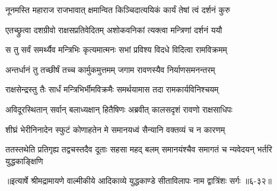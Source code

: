 \twolineshloka
{नूनमस्ति महाराज राजभावात् क्षमान्वित}
{किञ्चिदात्ययिकं कार्यं तेषां त्वं दर्शनं कुरु} %

\twolineshloka
{एतच्छ्रुत्वा दशग्रीवो राक्षसप्रतिवेदितम्}
{अशोकवनिकां त्यक्त्वा मन्त्रिणां दर्शनं ययौ} %

\twolineshloka
{स तु सर्वं समर्थ्यैव मन्त्रिभिः कृत्यमात्मनः}
{सभां प्रविश्य विदधे विदित्वा रामविक्रमम्} %

\twolineshloka
{अन्तर्धानं तु तच्छीर्षं तच्च कार्मुकमुत्तमम्}
{जगाम रावणस्यैव निर्याणसमनन्तरम्} %

\twolineshloka
{राक्षसेन्द्रस्तु तैः सार्धं मन्त्रिभिर्भीमविक्रमैः}
{समर्थयामास तदा रामकार्यविनिश्चयम्} %

\twolineshloka
{अविदूरस्थितान् सर्वान् बलाध्यक्षान् हितैषिणः}
{अब्रवीत् कालसदृशं रावणो राक्षसाधिपः} %

\twolineshloka
{शीघ्रं भेरीनिनादेन स्फुटं कोणाहतेन मे}
{समानयध्वं सैन्यानि वक्तव्यं च न कारणम्} %

\twolineshloka
{ततस्तथेति प्रतिगृह्य तद्वचस्तदैव दूताः सहसा महद् बलम्}
{समानयंश्चैव समागतं च न्यवेदयन् भर्तरि युद्धकाङ्क्षिणि} %


॥इत्यार्षे श्रीमद्रामायणे वाल्मीकीये आदिकाव्ये युद्धकाण्डे सीताविलापः नाम द्वात्रिंशः सर्गः ॥६-३२॥
